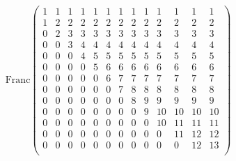 \documentclass{report}
\begin{document}
      \begin{equation}
	\textrm{Franc}
	\begin{pmatrix}
	  1 & 1 & 1 & 1 & 1 & 1 & 1 & 1 & 1 & 1 & 1 & 1 & 1 \\ 
	  1 & 2 & 2 & 2 & 2 & 2 & 2 & 2 & 2 & 2 & 2 & 2 & 2 \\ 
	  0 & 2 & 3 & 3 & 3 & 3 & 3 & 3 & 3 & 3 & 3 & 3 & 3 \\ 
	  0 & 0 & 3 & 4 & 4 & 4 & 4 & 4 & 4 & 4 & 4 & 4 & 4 \\ 
	  0 & 0 & 0 & 4 & 5 & 5 & 5 & 5 & 5 & 5 & 5 & 5 & 5 \\ 
	  0 & 0 & 0 & 0 & 5 & 6 & 6 & 6 & 6 & 6 & 6 & 6 & 6 \\ 
	  0 & 0 & 0 & 0 & 0 & 6 & 7 & 7 & 7 & 7 & 7 & 7 & 7 \\ 
	  0 & 0 & 0 & 0 & 0 & 0 & 7 & 8 & 8 & 8 & 8 & 8 & 8 \\ 
	  0 & 0 & 0 & 0 & 0 & 0 & 0 & 8 & 9 & 9 & 9 & 9 & 9 \\ 
	  0 & 0 & 0 & 0 & 0 & 0 & 0 & 0 & 9 & 10 & 10 & 10 & 10 \\ 
	  0 & 0 & 0 & 0 & 0 & 0 & 0 & 0 & 0 & 10 & 11 & 11 & 11 \\ 
	  0 & 0 & 0 & 0 & 0 & 0 & 0 & 0 & 0 & 0 & 11 & 12 & 12 \\ 
	  0 & 0 & 0 & 0 & 0 & 0 & 0 & 0 & 0 & 0 & 0 & 12 & 13 \\ 
	\end{pmatrix}
	\label{syst4}
      \end{equation}
      \normalsize
      \scriptsize
\end{document}
